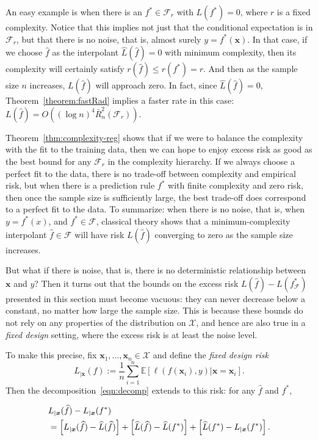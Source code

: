 An easy example is when there is an $f^*\in {\mathcal F}_r$ with $L(f^*)=0$, where $r$ is a fixed complexity. Notice that this implies not just that the conditional expectation is in ${\mathcal F}_r$, but that there is no noise, that is, almost surely $y=f^*({\boldsymbol x})$. In that case, if we choose $\widehat f$ as the interpolant $\widehat L(\widehat f)=0$ with minimum complexity, then its complexity will certainly satisfy
$r(\widehat f)\le r(f^*)=r$. And then as the sample size $n$ increases,
$L(\widehat f)$ will approach zero.  In fact, since $\widehat L(\widehat f)=0$,
Theorem~\ref{theorem:fastRad} implies a faster rate in this case:
$L(\widehat f) = O((\log n)^4\bar R_n^2({\mathcal F}_r))$.

Theorem~\ref{thm:complexity-reg} shows that if we were to balance the complexity with the fit to the training data, then we can hope to enjoy excess risk as good as the best bound for any ${\mathcal F}_r$ in the complexity hierarchy.  If we always choose a perfect fit to the data, there is no trade-off between complexity and empirical risk, but when there is a prediction rule $f^*$ with finite complexity and zero risk, then once the sample size is sufficiently large, the best trade-off does correspond to a perfect fit to the data. To summarize: when there is no noise, that is, when $y=f^*(x)$, and $f^*\in {\mathcal F}$, classical theory shows that a minimum-complexity interpolant $\widehat f\in {\mathcal F}$ will have risk $L(\widehat f)$ converging to zero as the sample size increases.

But what if there is noise, that is, there is no deterministic relationship between ${\boldsymbol x}$ and $y$? Then it turns out that the bounds on the excess risk $L(\widehat f)-L(f_{{\mathcal F}}^*)$ presented in this section must become vacuous: they can never decrease below a constant, no matter how large the sample size.  This is because these bounds do not rely on any properties of the distribution on ${\mathcal X}$, and hence are also true in a {\em fixed design} setting, where the excess risk is at least the noise level. 

To make this precise, fix ${\boldsymbol x}_1,\ldots,{\boldsymbol x}_n\in{\mathcal X}$ and define the {\em fixed design risk} $$ L_{|{\boldsymbol x}}(f) := \frac{1}{n}\sum_{i=1}^n
      {\mathbb E}\left[\left.\ell(f({\boldsymbol x}_i),y)\right|{\boldsymbol x}={\boldsymbol x}_i\right].$$
Then the decomposition~\eqref{eqn:decomp} extends to this risk: for any $\widehat f$ and $f^*$,

\begin{align*}
    \lefteqn{L_{|{\boldsymbol x}}(\widehat f) - L_{|{\boldsymbol x}}(f^*)} & \\*
      &= \left[ L_{|{\boldsymbol x}}(\widehat f) - \widehat L(\widehat f) \right]
        + \left[ \widehat L(\widehat f) - \widehat L(f^*) \right]
        + \left[ \widehat L(f^*) - L_{|{\boldsymbol x}}(f^*) \right].
  \end{align*}

